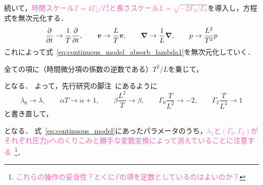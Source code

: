 \documentclass[12pt,dvipdfmx,svgnames,a4paper,uplatex]{ujarticle}
\theoremstyle{plain}
\begin{document}
続いて，\textcolor{HotPink}{時間スケール\(T = 4\Gamma_2/\Gamma_0^2\)と長さスケール\(L = \sqrt{-2\Gamma_2/\Gamma_0}\)}を導入し，方程式を無次元化する．
\begin{equation}
  \pdv{t} \to \frac{1}{T} \pdv{t}, \qquad \vb*{v} \to \frac{L}{T} \vb*{v}, \qquad \grad \to \frac{1}{L} \grad, \qquad p \to \frac{L^2}{T^2} p
  \label{eq:nondimensionalization_list}
\end{equation}
これによって式~\ref{eq:continuous_model_absorb_lambda1}を無次元化していく．
全ての項に（時間微分項の係数の逆数である）\(T^2/L\)を乗じて，
となる．
よって，先行研究の脚注~\cite[脚注28]{James2017}にあるように
\begin{equation}
  \lambda_0 \to \lambda, \qquad \alpha T \to \alpha + 1, \qquad \beta \frac{L^2}{T} \to \beta, \qquad \Gamma_0 \frac{T}{L^2} \to -2, \qquad \Gamma_2 \frac{T}{L^4} \to 1
  \label{eq:redefine_parameters}
\end{equation}
と書き直して，
となる．
式~\ref{eq:continuous_model}にあったパラメータのうち，\textcolor{HotPink}{\(\lambda_1\)と\((\Gamma_0, \Gamma_2)\)がそれぞれ圧力\(p\)へのくりこみと勝手な変数変換によって消えていることに注意する}~\footnote{\textcolor{HotPink}{これらの操作の妥当性？とくに\(\Gamma\)の項を定数としているのはよいのか？}}．
\end{document}
